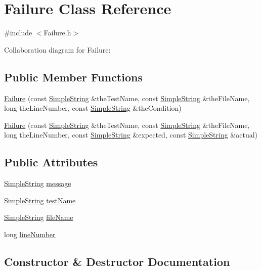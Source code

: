 \hypertarget{classFailure}{}\section{Failure Class Reference}
\label{classFailure}


{\ttfamily \#include $<$Failure.\+h$>$}



Collaboration diagram for Failure\+:
\subsection*{Public Member Functions}
\begin{DoxyCompactItemize}
\item 
\hyperlink{classFailure_a86c3af5cf8a92ac477b57c5a95f44132}{Failure} (const \hyperlink{classSimpleString}{Simple\+String} \&the\+Test\+Name, const \hyperlink{classSimpleString}{Simple\+String} \&the\+File\+Name, long the\+Line\+Number, const \hyperlink{classSimpleString}{Simple\+String} \&the\+Condition)
\item 
\hyperlink{classFailure_a1fbdcdf060b8c3d4dbf384dcdee0b8a8}{Failure} (const \hyperlink{classSimpleString}{Simple\+String} \&the\+Test\+Name, const \hyperlink{classSimpleString}{Simple\+String} \&the\+File\+Name, long the\+Line\+Number, const \hyperlink{classSimpleString}{Simple\+String} \&expected, const \hyperlink{classSimpleString}{Simple\+String} \&actual)
\end{DoxyCompactItemize}
\subsection*{Public Attributes}
\begin{DoxyCompactItemize}
\item 
\hyperlink{classSimpleString}{Simple\+String} \hyperlink{classFailure_ac1ce4e75209b0c66326740816305ab3f}{message}
\item 
\hyperlink{classSimpleString}{Simple\+String} \hyperlink{classFailure_a39551c8439707923dae209e9e381dcfe}{test\+Name}
\item 
\hyperlink{classSimpleString}{Simple\+String} \hyperlink{classFailure_ae2e8ad8d8f56849d83e91cb6397ea420}{file\+Name}
\item 
long \hyperlink{classFailure_a0b74b66c0460b6d7227b645e0f637e91}{line\+Number}
\end{DoxyCompactItemize}


\subsection{Constructor \& Destructor Documentation}
\hypertarget{classFailure_a86c3af5cf8a92ac477b57c5a95f44132}{}
